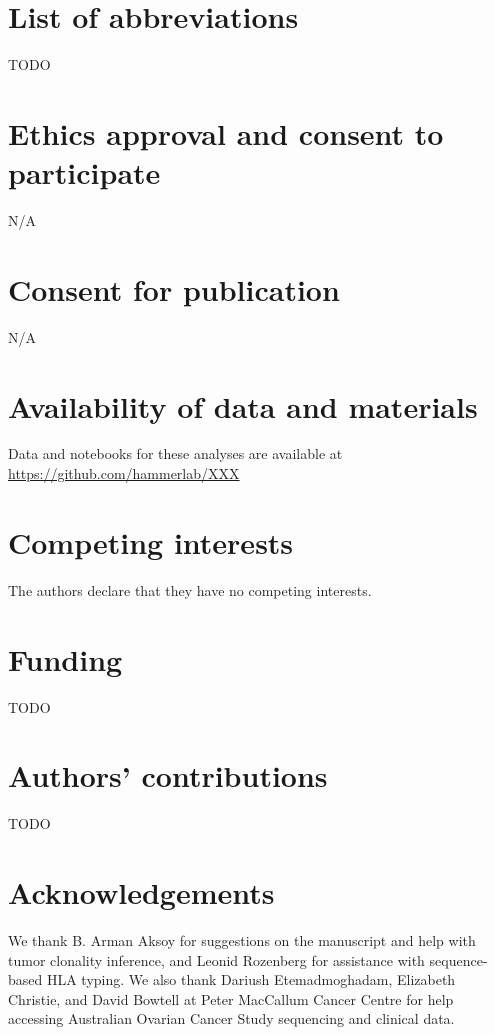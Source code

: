 \section{List of abbreviations}
TODO

\section{Ethics approval and consent to participate}
N/A

\section{Consent for publication}
N/A

\section{Availability of data and materials}
Data and notebooks for these analyses are available at \url{https://github.com/hammerlab/XXX}

\section{Competing interests}
The authors declare that they have no competing interests.

\section{Funding}
TODO

\section{Authors' contributions}
TODO

\section{Acknowledgements}
We thank B. Arman Aksoy for suggestions on the manuscript and help with tumor clonality inference, and Leonid Rozenberg for assistance with sequence-based HLA typing. We also thank Dariush Etemadmoghadam, Elizabeth Christie, and David Bowtell at Peter MacCallum Cancer Centre for help accessing Australian Ovarian Cancer Study sequencing and clinical data.
